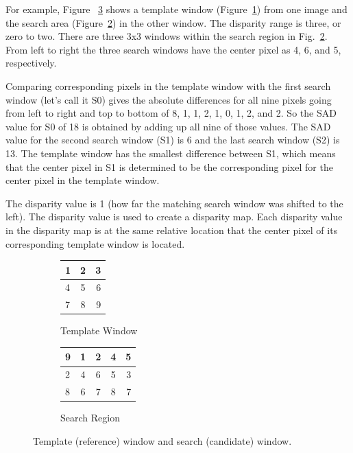 For example, Figure ~\ref{fig:windows} shows a template window (Figure~\ref{fig:template}) from one image and the search area (Figure~\ref{fig:search}) in the other window. The disparity range is three, or zero to two. There are three 3x3 windows within the search region in Fig.~\ref{fig:search}. From left to right the three search windows have the center pixel as 4, 6, and 5, respectively. 

Comparing corresponding pixels in the template window with the first search window (let's call it S0) gives the absolute differences for all nine pixels going from left to right and top to bottom of 8, 1, 1, 2, 1, 0, 1, 2, and 2. So the SAD value for S0 of 18 is obtained by adding up all nine of those values. The SAD value for the second search window (S1) is 6 and the last search window (S2) is 13. The template window has the smallest difference between S1, which means that the center pixel in S1 is determined to be the corresponding pixel for the center pixel in the template window. 

The disparity value is 1 (how far the matching search window was shifted to the left). The disparity value is used to create a disparity map. Each disparity value in the disparity map is at the same relative location that the center pixel of its corresponding template window is located.

\begin{figure}
\begin{center}
	\begin{subfigure}{0.3\textwidth}
		\begin{center}				
			\begin{tabular}{|l|c|r|}
				\hline
				1 & 2 & 3 \\\hline
	  			4 & 5 & 6 \\\hline
		    	7 & 8 & 9 \\
		    	\hline
			\end{tabular}
		\end{center}
		\caption{Template Window}
		\label{fig:template}
	\end{subfigure}
	\begin{subfigure}{0.3\textwidth}
		\begin{center}		
			\begin{tabular}{|l|c|c|c|r|}
				\hline
				9 & 1 & 2 & 4 & 5 \\\hline
		  		2 & 4 & 6 & 5 & 3 \\\hline
		    	8 & 6 & 7 & 8 & 7 \\
		    	\hline
			\end{tabular}
		\end{center}
		\caption{Search Region}
		\label{fig:search}
	\end{subfigure}
	\captionfonts
	\caption{Template (reference) window and search (candidate) window.}
	\label{fig:windows}
\end{center}
\end{figure}










